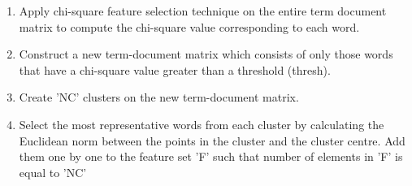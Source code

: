 \documentclass[a4paper, 14pt]{article}
\begin{document}
\begin{justify}
\begin{justify}
\begin{enumerate}
  \item Apply chi-square feature selection technique on the entire term document matrix to compute the chi-square value corresponding to each word.
  \item Construct a new term-document matrix which consists of only those words that have a chi-square value greater than a threshold (thresh).
  \item Create 'NC' clusters on the new term-document matrix.
  \item Select the most representative words from each cluster by calculating the Euclidean norm between the points in the cluster and the cluster centre. Add them one by one to the feature set 'F' such that number of elements in 'F' is equal to 'NC'  
\end{enumerate}

\end{justify}


\end{justify}

\clearpage
\end{document}
